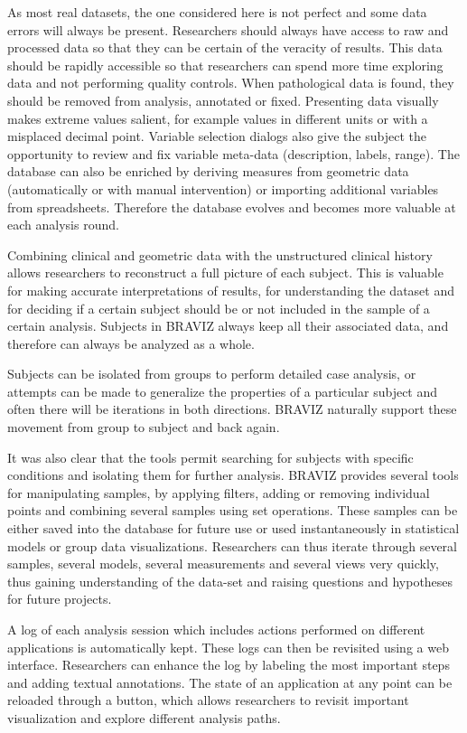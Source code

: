 \documentclass[twocolumn]{svjour3}
\begin{document}
As most real datasets, the one considered here is not perfect and some data errors will always be present. Researchers should always have access to raw and processed data so that they can be certain of the veracity of results. This data should be rapidly accessible so that researchers can spend more time exploring data and not performing quality controls. When pathological data is found, they should be removed from analysis, annotated or fixed. Presenting data visually makes extreme values salient, for example values in different units or with a misplaced decimal point. Variable selection dialogs also give the subject the opportunity to review and fix variable meta-data (description, labels, range). The database can also be enriched by deriving measures from geometric data (automatically or with manual intervention) or importing additional variables from spreadsheets. Therefore the database evolves and becomes more valuable at each analysis round. 

Combining clinical and geometric data with the unstructured clinical history allows researchers to reconstruct a full picture of each subject. This is valuable for making accurate interpretations of results, for understanding the dataset and for deciding if a certain subject should be or not included in the sample of a certain analysis. Subjects in BRAVIZ always keep all their associated data, and therefore can always be analyzed as a whole.

Subjects can be isolated from groups to perform detailed case analysis, or attempts can be made to generalize the properties of a particular subject and often there will be iterations in both directions. BRAVIZ naturally support these movement from group to subject and back again.

It was also clear that the tools permit searching for subjects with specific conditions and isolating them for further analysis.
BRAVIZ provides several tools for manipulating samples, by applying filters, adding or removing individual points and combining several samples using set operations. These samples can be either saved into the database for future use or used instantaneously in statistical models or group data visualizations. Researchers can thus iterate through several samples, several models, several measurements and several views very quickly, thus gaining understanding of the data-set and raising questions and hypotheses for future projects.

A log of each analysis session which includes actions performed on different applications is automatically kept. These logs can then be revisited using a web interface. Researchers can enhance the log by labeling the most important steps and adding textual annotations. The state of an application at any point can be reloaded through a button, which allows researchers to revisit important visualization and explore different analysis paths. 
\end{document}
